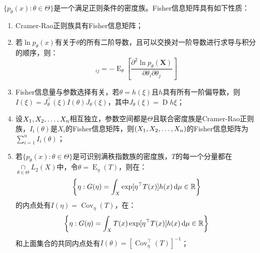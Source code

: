 \begin{property}\label{prop:FIM}
	$\{p_{\theta}(x):\theta\in\Theta\}$是一个满足正则条件的密度族。Fisher信息矩阵具有如下性质：
	\begin{enumerate}
		\item Cramer-Rao正则族具有Fisher信息矩阵；
		\item 若$\ln p_{\theta}(x)$有关于$\theta$的所有二阶导数，且可以交换对一阶导数进行求导与积分的顺序，则：
		\begin{equation*}
			[I(\theta)]_{ij}=-\operatorname{E}_{\theta}\left[\frac{\partial^2\ln p_{\theta}( \mathbf{X})}{\partial\theta_i\partial\theta_j}\right]
		\end{equation*}
		\item Fisher信息量与参数选择有关，若$\theta=h(\xi)$且$h$具有所有一阶偏导数，则$I(\xi)=J_{\theta}^{\top}(\xi)I(\theta)J_{\theta}(\xi)$，其中$J_{\theta}(\xi)=\operatorname{D}h\xi$；
		\item 设$X_1, X_2, \dots, X_{n}$相互独立，参数空间都是$\Theta$且联合密度族是Cramer-Rao正则族，$I_i(\theta)$是$X_i$的Fisher信息矩阵，则$(X_1, X_2, \dots, X_{n})$的Fisher信息矩阵为$\sum\limits_{i=1}^{n}I_i(\theta)$；
		\item 若$\{p_{\theta}(x):\theta\in\Theta\}$是可识别满秩指数族的密度族，$T$的每一个分量都在$\underset{\theta\in\Theta}{\cap}L_2(X)$中，令$\theta=\operatorname{E}_{\eta}(T)$，则在：
		\begin{equation*}
			\left\{\eta:G(\eta)=\int_{X}\exp[\eta^{\top}T(x)]h(x)\mathop{}\!\mathrm{d}\mu\in\mathbb{R}\right\}
		\end{equation*}
		的内点处有$I(\eta)=\operatorname{Cov}_{\eta}(T)$，在：
		\begin{equation*}
			\left\{\eta:G(\eta)=\int_{X}T(x)\exp[\eta^{\top}T(x)]h(x)\mathop{}\!\mathrm{d}\mu\in\mathbb{R}\right\}
		\end{equation*}
		和上面集合的共同内点处有$I(\theta)=[\operatorname{Cov}_{\eta}^{\top}(T)]^{-1}$；
	\end{enumerate}
\end{property}
